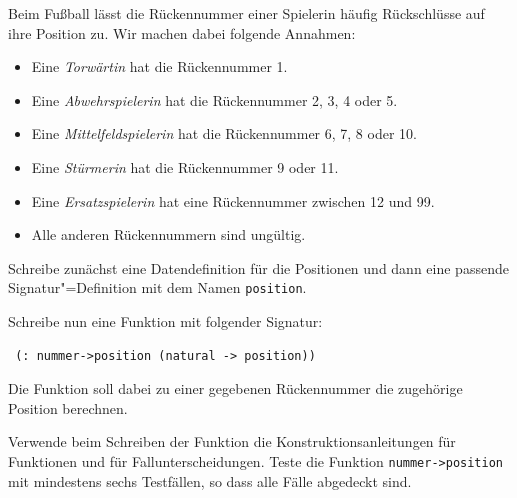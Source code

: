 \begin{aufgabe}
  Beim Fußball lässt die Rückennummer einer Spielerin
  häufig Rückschlüsse auf ihre Position zu. Wir machen dabei folgende
  Annahmen:
  \begin{itemize}
  \item Eine \emph{Torwärtin} hat die Rückennummer 1.
  \item Eine \emph{Abwehrspielerin} hat die Rückennummer 2, 3, 4 oder 5.
  \item Eine \emph{Mittelfeldspielerin} hat die Rückennummer 6, 7, 8 oder 10.
  \item Eine \emph{Stürmerin} hat die Rückennummer 9 oder 11.
  \item Eine \emph{Ersatzspielerin} hat eine Rückennummer zwischen 12 und 99.
  \item Alle anderen Rückennummern sind ungültig.
  \end{itemize}
  Schreibe zunächst eine Datendefinition für die Positionen und dann eine
  passende Signatur"=Definition mit dem Namen \lstinline{position}.
  
  Schreibe nun eine Funktion mit folgender Signatur:
\begin{lstlisting}
 (: nummer->position (natural -> position))
\end{lstlisting}
  Die Funktion soll dabei zu einer gegebenen Rückennummer die
  zugehörige Position berechnen.

  Verwende beim Schreiben der Funktion die
  Konstruktionsanleitungen für Funktionen und für
  Fallunterscheidungen.  Teste die Funktion
  \lstinline{nummer->position} mit mindestens sechs Testfällen, so dass
  alle Fälle abgedeckt sind.
\end{aufgabe}


